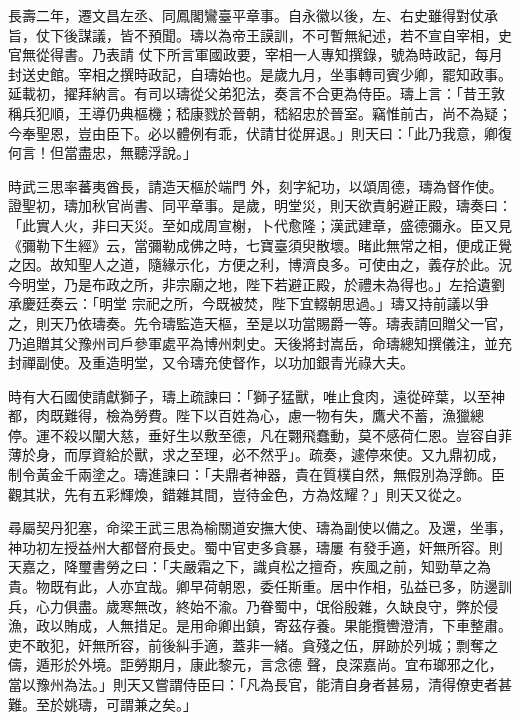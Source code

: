\begin{pinyinscope}
 長壽二年，遷文昌左丞、同鳳閣鸞臺平章事。自永徽以後，左、右史雖得對仗承旨，仗下後謀議，皆不預聞。璹以為帝王謨訓，不可暫無紀述，若不宣自宰相，史官無從得書。乃表請
 仗下所言軍國政要，宰相一人專知撰錄，號為時政記，每月封送史館。宰相之撰時政記，自璹始也。是歲九月，坐事轉司賓少卿，罷知政事。延載初，擢拜納言。有司以璹從父弟犯法，奏言不合更為侍臣。璹上言：「昔王敦稱兵犯順，王導仍典樞機；嵇康戮於晉朝，嵇紹忠於晉室。竊惟前古，尚不為疑；今奉聖恩，豈由臣下。必以體例有乖，伏請甘從屏退。」則天曰：「此乃我意，卿復何言！但當盡忠，無聽浮說。」



 時武三思率蕃夷酋長，請造天樞於端門
 外，刻字紀功，以頌周德，璹為督作使。證聖初，璹加秋官尚書、同平章事。是歲，明堂災，則天欲責躬避正殿，璹奏曰：「此實人火，非曰天災。至如成周宣榭，卜代愈隆；漢武建章，盛德彌永。臣又見《彌勒下生經》云，當彌勒成佛之時，七寶臺須臾散壞。睹此無常之相，便成正覺之因。故知聖人之道，隨緣示化，方便之利，博濟良多。可使由之，義存於此。況今明堂，乃是布政之所，非宗廟之地，陛下若避正殿，於禮未為得也。」左拾遺劉承慶廷奏云：「明堂
 宗祀之所，今既被焚，陛下宜輟朝思過。」璹又持前議以爭之，則天乃依璹奏。先令璹監造天樞，至是以功當賜爵一等。璹表請回贈父一官，乃追贈其父豫州司戶參軍處平為博州刺史。天後將封嵩岳，命璹總知撰儀注，並充封禪副使。及重造明堂，又令璹充使督作，以功加銀青光祿大夫。



 時有大石國使請獻獅子，璹上疏諫曰：「獅子猛獸，唯止食肉，遠從碎葉，以至神都，肉既難得，檢為勞費。陛下以百姓為心，慮一物有失，鷹犬不蓄，漁獵總
 停。運不殺以闡大慈，垂好生以敷至德，凡在翾飛蠢動，莫不感荷仁恩。豈容自菲薄於身，而厚資給於獸，求之至理，必不然乎」。疏奏，遽停來使。又九鼎初成，制令黃金千兩塗之。璹進諫曰：「夫鼎者神器，貴在質樸自然，無假別為浮飾。臣觀其狀，先有五彩輝煥，錯雜其間，豈待金色，方為炫耀？」則天又從之。



 尋屬契丹犯塞，命梁王武三思為榆關道安撫大使、璹為副使以備之。及還，坐事，神功初左授益州大都督府長史。蜀中官吏多貪暴，璹屢
 有發手適，奸無所容。則天嘉之，降璽書勞之曰：「夫嚴霜之下，識貞松之擅奇，疾風之前，知勁草之為貴。物既有此，人亦宜哉。卿早荷朝恩，委任斯重。居中作相，弘益已多，防邊訓兵，心力俱盡。歲寒無改，終始不渝。乃眷蜀中，氓俗殷雜，久缺良守，弊於侵漁，政以賄成，人無措足。是用命卿出鎮，寄茲存養。果能攬轡澄清，下車整肅。吏不敢犯，奸無所容，前後糾手適，蓋非一緒。貪殘之伍，屏跡於列城；剽奪之儔，遁形於外境。詎勞期月，康此黎元，言念德
 聲，良深嘉尚。宜布瑯邪之化，當以豫州為法。」則天又嘗謂侍臣曰：「凡為長官，能清自身者甚易，清得僚吏者甚難。至於姚璹，可謂兼之矣。」




\end{pinyinscope}
